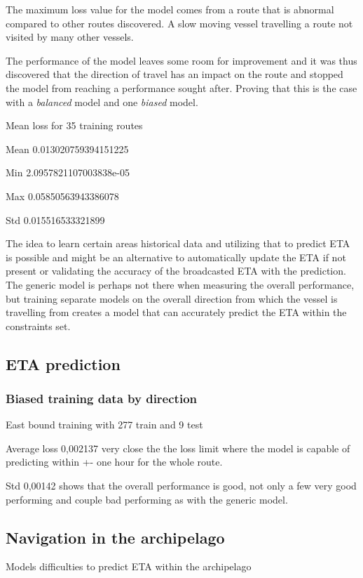 \documentclass[../main.tex]{subfiles}
\begin{document}
The maximum loss value for the model comes from a route that is abnormal compared to other routes discovered. A slow moving vessel travelling a route not visited by many other vessels.

The performance of the model leaves some room for improvement and it was thus discovered that the direction of travel has an impact on the route and stopped the model from reaching a performance sought after. Proving that this is the case with a \textit{balanced} model and one \textit{biased} model.


Mean loss for 35 training routes

Mean 0.013020759394151225 

Min 2.0957821107003838e-05 

Max 0.05850563943386078 

Std 0.015516533321899

The idea to learn certain areas historical data and utilizing that to predict ETA is possible and might be an alternative to automatically update the ETA if not present or validating the accuracy of the broadcasted ETA with the prediction. The generic model is perhaps not there when measuring the overall performance, but training separate models on the overall direction from which the vessel is travelling from creates a model that can accurately predict the ETA within the constraints set. 


\subsection{ETA prediction}

\subsubsection{Biased training data by direction}
East bound training with 277 train and 9 test

Average loss 0,002137 very close the the loss limit where the model is capable of predicting within +- one hour for the whole route.

Std 0,00142 shows that the overall performance is good, not only a few very good performing and couple bad performing as with the generic model.
\subsection{Navigation in the archipelago}

Models difficulties to predict ETA within the archipelago
\end{document}
